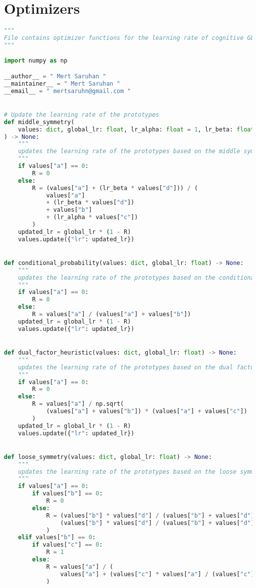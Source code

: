 \section*{\hypertarget{appoptim}{Optimizers}}
\begin{lstlisting}[language=Python]
"""
File contains optimizer functions for the learning rate of cognitive GLVQ (CGLVQ) model.
"""

import numpy as np

__author__ = " Mert Saruhan "
__maintainer__ = " Mert Saruhan "
__email__ = " mertsaruhn@gmail.com "


# Update the learning rate of the prototypes
def middle_symmetry(
    values: dict, global_lr: float, lr_alpha: float = 1, lr_beta: float = 0
) -> None:
    """
    updates the learning rate of the prototypes based on the middle symmetry with alpha = 1 and beta = 0
    """
    if values["a"] == 0:
        R = 0
    else:
        R = (values["a"] + (lr_beta * values["d"])) / (
            values["a"]
            + (lr_beta * values["d"])
            + values["b"]
            + (lr_alpha * values["c"])
        )
    updated_lr = global_lr * (1 - R)
    values.update({"lr": updated_lr})


def conditional_probability(values: dict, global_lr: float) -> None:
    """
    updates the learning rate of the prototypes based on the conditional probability
    """
    if values["a"] == 0:
        R = 0
    else:
        R = values["a"] / (values["a"] + values["b"])
    updated_lr = global_lr * (1 - R)
    values.update({"lr": updated_lr})


def dual_factor_heuristic(values: dict, global_lr: float) -> None:
    """
    updates the learning rate of the prototypes based on the dual factor heuristic
    """
    if values["a"] == 0:
        R = 0
    else:
        R = values["a"] / np.sqrt(
            (values["a"] + values["b"]) * (values["a"] + values["c"])
        )
    updated_lr = global_lr * (1 - R)
    values.update({"lr": updated_lr})


def loose_symmetry(values: dict, global_lr: float) -> None:
    """
    updates the learning rate of the prototypes based on the loose symmetry
    """
    if values["a"] == 0:
        if values["b"] == 0:
            R = 0
        else:
            R = (values["b"] * values["d"] / (values["b"] + values["d"])) / (
                (values["b"] * values["d"] / (values["b"] + values["d"])) + values["b"]
            )
    elif values["b"] == 0:
        if values["c"] == 0:
            R = 1
        else:
            R = values["a"] / (
                values["a"] + (values["c"] * values["a"] / (values["c"] + values["a"]))
            )


\end{lstlisting}
